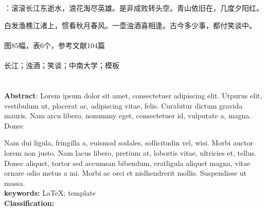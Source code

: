 \newpage
\fancyhead[L,C,R]{}
\renewcommand{\headrule}{\color{lightgray}\hrule width\headwidth height0.0pt}
\chapter*{\mytitle}

\setlength{\baselineskip}{20pt}

：滚滚长江东逝水，浪花淘尽英雄。是非成败转头空。青山依旧在，几度夕阳红。

白发渔樵江渚上，惯看秋月春风。一壶浊酒喜相逢。古今多少事，都付笑谈中。\\
\\
图85幅，表6个，参考文献104篇\\\\
 长江；浊酒；笑谈；中南大学；\LaTeXe 模板\\
 \zhongtu


\vspace*{1ex}
\chapter*{\myEnlishTitle}

\setlength{\baselineskip}{20pt}
\noindent\textbf{Abstract}: Lorem ipsum dolor sit amet, consectetuer adipiscing elit. Utpurus elit, vestibulum ut, placerat ac, adipiscing vitae, felis. Curabitur	dictum gravida mauris. Nam arcu libero, nonummy eget, consectetuer id,	vulputate a, magna. Donec

Nam dui ligula, fringilla a, euismod sodales, sollicitudin vel, wisi. Morbi auctor lorem non justo. Nam lacus libero, pretium at, lobortis vi­tae, ultricies et, tellus. Donec aliquet, tortor sed accumsan bibendum, eratligula aliquet magna, vitae ornare odio metus a mi. Morbi ac orci et nislhendrerit mollis. Suspendisse ut massa.\\

\noindent\textbf{keywords:} \LaTeX; template\\
\noindent\textbf{Classification:} \zhongtu



